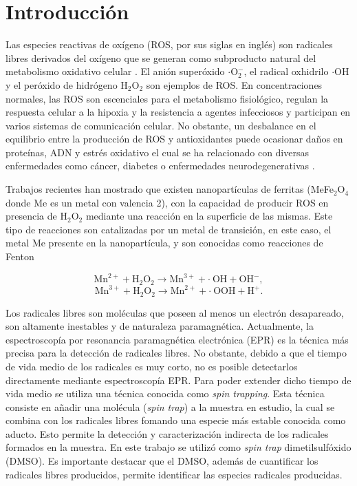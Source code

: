 \documentclass[aps,prl,reprint,superscriptaddress,showkeys]{revtex4-2}
\begin{document}
\section{Introducción}

Las especies reactivas de oxígeno (ROS, por sus siglas en inglés) son radicales libres derivados del oxígeno que se generan como subproducto natural del metabolismo oxidativo celular \cite{liu_biomedical_2020}. El anión superóxido $\cdot$O$_2^-$, el radical oxhidrilo $\cdot$OH y el peróxido de hidrógeno H$_2$O$_2$ son ejemplos de ROS. En concentraciones normales, las ROS son escenciales para el metabolismo fisiológico, regulan la respuesta celular a la hipoxia y la resistencia a agentes infecciosos y participan en varios sistemas de comunicación celular. No obstante, un desbalance en el equilibrio entre la producción de ROS y antioxidantes puede ocasionar daños en proteínas, ADN y estrés oxidativo el cual se ha relacionado con diversas enfermedades como cáncer, diabetes o enfermedades neurodegenerativas \cite{liu_biomedical_2020}. 

Trabajos recientes \cite{maldonado_actividad_nodate} \cite{gao_intrinsic_2007} han mostrado que existen nanopartículas de ferritas (MeFe$_2$O$_4$ donde Me es un metal con valencia 2), con la capacidad de producir ROS en presencia de H$_2$O$_2$ mediante una reacción en la superficie de las mismas. Este tipo de reacciones son catalizadas por un metal de transición, en este caso, el metal Me presente en la nanopartícula, y son conocidas como reacciones de Fenton \cite{FentonLXXIIIOxidationOT}

 \begin{equation}
    \text{Mn}^{2+} + \text{H}_2\text{O}_2 \longrightarrow \text{Mn}^{3+}  + \cdot ~ \text{OH} + \text{OH}^{-},
\end{equation}
\begin{equation}
    \text{Mn}^{3+} + \text{H}_2\text{O}_2 \longrightarrow \text{Mn}^{2+}  + \cdot ~ \text{OOH} + \text{H}^{+}.
\end{equation}

Los radicales libres son moléculas que poseen al menos un electrón desapareado, son altamente inestables y de naturaleza paramagnética. Actualmente, la espectroscopía por resonancia paramagnética electrónica (EPR) es la técnica más precisa para la detección de radicales libres. No obstante, debido a que el tiempo de vida medio de los radicales es muy corto, no es posible detectarlos directamente mediante espectroscopía EPR. Para poder extender dicho tiempo de vida medio se utiliza una técnica conocida como \textit{spin trapping}. Esta técnica consiste en añadir una molécula (\textit{spin trap}) a la muestra en estudio, la cual se combina con los radicales libres fomando una especie más estable conocida como aducto. Esto permite la detección y caracterización indirecta de los radicales formados en la muestra. En este trabajo se utilizó como \textit{spin trap} dimetilsulfóxido (DMSO). Es importante destacar que el DMSO, además de cuantificar los radicales libres producidos, permite identificar las especies radicales producidas. 
\end{document}
